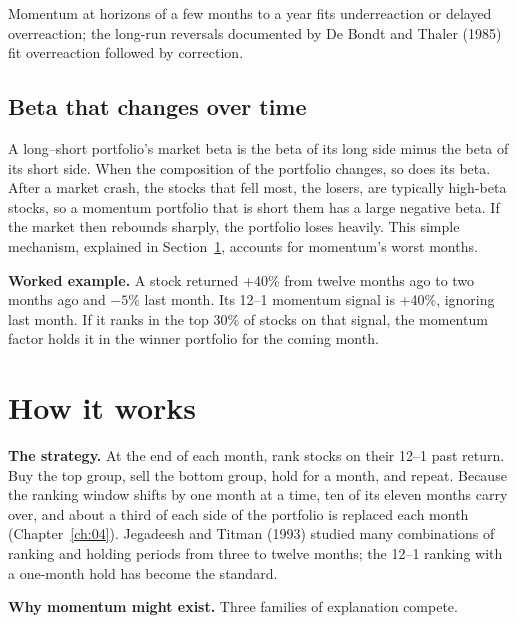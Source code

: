 Momentum at horizons of a few months to a year fits underreaction or delayed overreaction; the long-run reversals documented by De Bondt and Thaler (1985) fit overreaction followed by correction.

\subsection{Beta that changes over time}

A long--short portfolio's market beta is the beta of its long side minus the beta of its short side. When the composition of the portfolio changes, so does its beta. After a market crash, the stocks that fell most, the losers, are typically high-beta stocks, so a momentum portfolio that is short them has a large negative beta. If the market then rebounds sharply, the portfolio loses heavily. This simple mechanism, explained in Section~\ref{sec:06-how}, accounts for momentum's worst months.

\textbf{Worked example.} A stock returned +40\% from twelve months ago to two months ago and $-5$\% last month. Its 12--1 momentum signal is +40\%, ignoring last month. If it ranks in the top 30\% of stocks on that signal, the momentum factor holds it in the winner portfolio for the coming month.

\section{How it works}
\label{sec:06-how}

\textbf{The strategy.} At the end of each month, rank stocks on their 12--1 past return. Buy the top group, sell the bottom group, hold for a month, and repeat. Because the ranking window shifts by one month at a time, ten of its eleven months carry over, and about a third of each side of the portfolio is replaced each month (Chapter~\ref{ch:04}). Jegadeesh and Titman (1993) studied many combinations of ranking and holding periods from three to twelve months; the 12--1 ranking with a one-month hold has become the standard.

\textbf{Why momentum might exist.} Three families of explanation compete.

